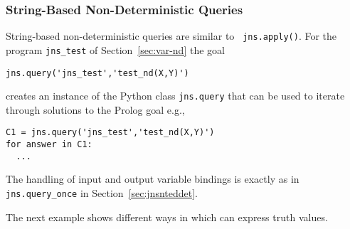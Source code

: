 \subsubsection{String-Based Non-Deterministic Queries} \label{sec:nd-query}

String-based non-deterministic queries are similar to {\tt
  jns.apply()}.  For the program {\tt jns\_test} of
Section~\ref{sec:var-nd} the goal
\begin{verbatim}
jns.query('jns_test','test_nd(X,Y)')
\end{verbatim}
creates an instance of the Python class {\tt jns.query} that can be used
to iterate through solutions to the Prolog goal  e.g., 
\begin{verbatim}
C1 = jns.query('jns_test','test_nd(X,Y)')
for answer in C1:
  ...
\end{verbatim}
The handling of input and output variable bindings is exactly as in
{\tt jns.query\_once} in Section~\ref{sec:jnsnteddet}.

The next example shows different ways in which \januspy{} can express
truth values.

